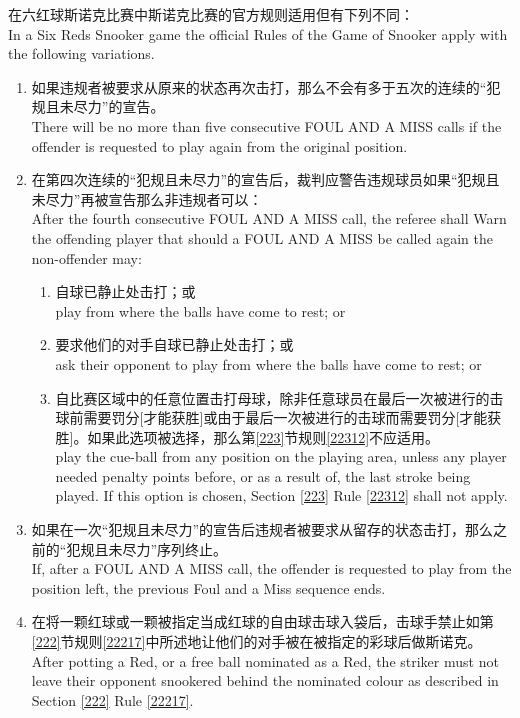 \noindent 在六红球斯诺克比赛中斯诺克比赛的官方规则适用但有下列不同：\\
In a Six Reds Snooker game the official Rules of the Game of 
Snooker apply with the following variations.
\begin{enumerate}[label=(\alph*)]
    \item 如果违规者被要求从原来的状态再次击打，那么不会有多于五次的连续的``犯规且未尽力''的宣告。\\
    There will be no more than five consecutive FOUL AND A MISS calls if the offender is requested to play again from the original position.
    \item 在第四次连续的``犯规且未尽力''的宣告后，裁判应警告违规球员如果``犯规且未尽力''再被宣告那么非违规者可以：\\
    After the fourth consecutive FOUL AND A MISS call, the referee shall Warn the offending player that should a FOUL AND A MISS be called again the non-offender may:
    \begin{enumerate}[label=(\roman*)]
        \item 自球已静止处击打；或\\
        play from where the balls have come to rest; or
        \item 要求他们的对手自球已静止处击打；或\\
        ask their opponent to play from where the balls have come to rest; or
        \item 自比赛区域中的任意位置击打母球，除非任意球员在最后一次被进行的击球前需要罚分[才能获胜]或由于最后一次被进行的击球而需要罚分[才能获胜]。如果此选项被选择，那么第\ref{223}节规则\ref{22312}不应适用。\\
        play the cue-ball from any position on the playing area, unless any player needed penalty points before, or as a result of, the last stroke being played. If this option is chosen, Section \ref{223} Rule \ref{22312} shall not apply.
    \end{enumerate}
    \item 如果在一次``犯规且未尽力''的宣告后违规者被要求从留存的状态击打，那么之前的``犯规且未尽力''序列终止。\\
    If, after a FOUL AND A MISS call, the offender is requested to play from the position left, the previous Foul and a Miss sequence ends.
    \item 在将一颗红球或一颗被指定当成红球的自由球击球入袋后，击球手禁止如第\ref{222}节规则\ref{22217}中所述地让他们的对手被在被指定的彩球后做斯诺克。\\
    After potting a Red, or a free ball nominated as a Red, the striker must not leave their opponent snookered behind the nominated colour as described in Section \ref{222} Rule \ref{22217}.
\end{enumerate}

